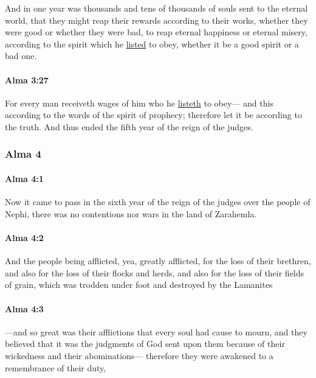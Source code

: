 			And in one year was thousands and tens of thousands of souls
			sent to the eternal world,
			that they might reap their rewards according to their works,
			whether they were good or whether they were bad,
			to reap eternal happiness or eternal misery,
			according to the spirit which he \hyperref[LIST]{listed} to obey,
			whether it be a good spirit or a bad one.

		\paragraph{Alma 3:27} %
			\label{ALMA-3-27}

			For every man receiveth wages of him who he \hyperref[LIST]{listeth} to obey---
			and this according to the words of the spirit of prophecy;
			therefore let it be according to the truth.
			And thus ended the fifth year of the reign of the judges.

	\subsubsection{Alma 4} %
		\label{ALMA-4}
		
		\paragraph{Alma 4:1} %
			\label{ALMA-4-1}

			Now it came to pass
			in the sixth year of the reign of the judges over the people of Nephi,
			there was no contentions nor wars in the land of Zarahemla.

		\paragraph{Alma 4:2} %
			\label{ALMA-4-2}

			And the people being afflicted,
			yea, greatly afflicted, for the loss of their brethren,
			and also for the loss of their flocks and herds,
			and also for the loss of their fields of grain,
			which was trodden under foot and destroyed by the Lamanites

		\paragraph{Alma 4:3} %
			\label{ALMA-4-3}

			---and so great was their afflictions that every soul had cause to mourn,
			and they believed that it was the judgments of God sent upon them
			because of their wickedness and their abominations---
			therefore they were awakened to a remembrance of their duty,

